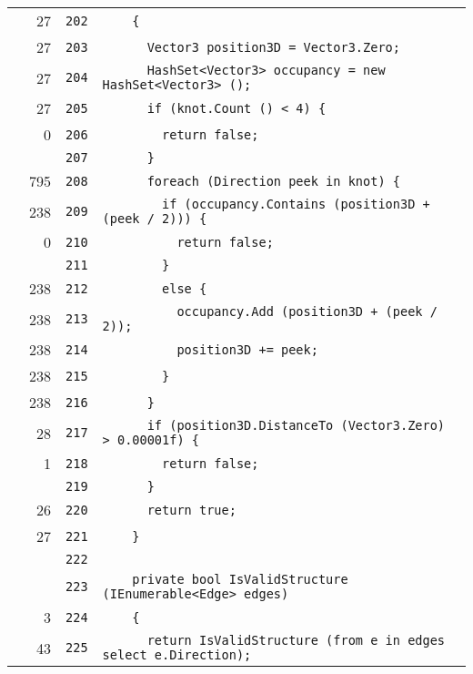 \documentclass[a4paper,10pt]{article}
\begin{document}
\begin{longtable}[l]{lrrl}
\cellcolor{green} & 27 & \verb~202~ & \verb~    {~\\
\cellcolor{green} & 27 & \verb~203~ & \verb~      Vector3 position3D = Vector3.Zero;~\\
\cellcolor{green} & 27 & \verb~204~ & \verb~      HashSet<Vector3> occupancy = new HashSet<Vector3> ();~\\
\cellcolor{green} & 27 & \verb~205~ & \verb~      if (knot.Count () < 4) {~\\
\cellcolor{red} & 0 & \verb~206~ & \verb~        return false;~\\
\cellcolor{gray} &  & \verb~207~ & \verb~      }~\\
\cellcolor{green} & 795 & \verb~208~ & \verb~      foreach (Direction peek in knot) {~\\
\cellcolor{green} & 238 & \verb~209~ & \verb~        if (occupancy.Contains (position3D + (peek / 2))) {~\\
\cellcolor{red} & 0 & \verb~210~ & \verb~          return false;~\\
\cellcolor{gray} &  & \verb~211~ & \verb~        }~\\
\cellcolor{green} & 238 & \verb~212~ & \verb~        else {~\\
\cellcolor{green} & 238 & \verb~213~ & \verb~          occupancy.Add (position3D + (peek / 2));~\\
\cellcolor{green} & 238 & \verb~214~ & \verb~          position3D += peek;~\\
\cellcolor{green} & 238 & \verb~215~ & \verb~        }~\\
\cellcolor{green} & 238 & \verb~216~ & \verb~      }~\\
\cellcolor{green} & 28 & \verb~217~ & \verb~      if (position3D.DistanceTo (Vector3.Zero) > 0.00001f) {~\\
\cellcolor{green} & 1 & \verb~218~ & \verb~        return false;~\\
\cellcolor{gray} &  & \verb~219~ & \verb~      }~\\
\cellcolor{green} & 26 & \verb~220~ & \verb~      return true;~\\
\cellcolor{green} & 27 & \verb~221~ & \verb~    }~\\
\cellcolor{gray} &  & \verb~222~ & \verb~~\\
\cellcolor{gray} &  & \verb~223~ & \verb~    private bool IsValidStructure (IEnumerable<Edge> edges)~\\
\cellcolor{green} & 3 & \verb~224~ & \verb~    {~\\
\cellcolor{green} & 43 & \verb~225~ & \verb~      return IsValidStructure (from e in edges select e.Direction);~\\

\end{longtable}
\end{document}
